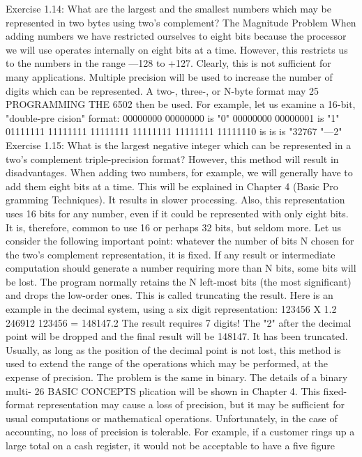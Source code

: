\documentclass{book}
\begin{document}
Exercise 1.14: What are the largest and the smallest numbers
which may be represented in two bytes using two's complement?
The Magnitude Problem
When adding numbers we have restricted ourselves to eight bits
because the processor we will use operates internally on eight bits
at a time. However, this restricts us to the numbers in the range
—128 to +127. Clearly, this is not sufficient for many applications.
Multiple precision will be used to increase the number of digits
which can be represented. A two-, three-, or N-byte format may
25
PROGRAMMING THE 6502
then be used. For example, let us examine a 16-bit, "double-pre
cision" format:
00000000 00000000 is "0"
00000000 00000001 is "1"
01111111
11111111
11111111
11111111
11111111
11111110
is
is
is
"32767
"—2"
Exercise 1.15: What is the largest negative integer which can be
represented in a two's complement triple-precision format?
However, this method will result in disadvantages. When adding
two numbers, for example, we will generally have to add them
eight bits at a time. This will be explained in Chapter 4 (Basic Pro
gramming Techniques). It results in slower processing. Also, this
representation uses 16 bits for any number, even if it could be
represented with only eight bits. It is, therefore, common to use 16
or perhaps 32 bits, but seldom more.
Let us consider the following important point: whatever the
number of bits N chosen for the two's complement representation,
it is fixed. If any result or intermediate computation should
generate a number requiring more than N bits, some bits will be
lost. The program normally retains the N left-most bits (the most
significant) and drops the low-order ones. This is called truncating
the result.
Here is an example in the decimal system, using a six digit
representation:
123456
X 1.2
246912
123456
= 148147.2
The result requires 7 digits! The "2" after the decimal point will be
dropped and the final result will be 148147. It has been truncated.
Usually, as long as the position of the decimal point is not lost, this
method is used to extend the range of the operations which may be
performed, at the expense of precision.
The problem is the same in binary. The details of a binary multi-
26
BASIC CONCEPTS
plication will be shown in Chapter 4.
This fixed-format representation may cause a loss of precision,
but it may be sufficient for usual computations or mathematical
operations.
Unfortunately, in the case of accounting, no loss of precision is
tolerable. For example, if a customer rings up a large total on a
cash register, it would not be acceptable to have a five figure
\end{document}
